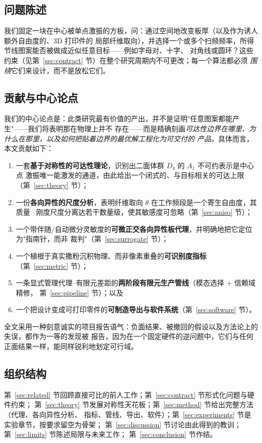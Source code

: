\documentclass[11pt,a4paper]{article}
\newcommand{\Aone}{A_1}
\newcommand{\Dfour}{D_4}
\begin{document}
\subsection{问题陈述}
我们固定一块在中心被单点激振的方板，问：通过空间地改变板厚（以及作为诱人额外自由度的、3D 打印件的
局部纤维取向），并选择一个或多个扫频频率，所得节线图案能否被做成近似任意目标------例如字母对、十字、
对角线或圆环？这些约束（见第~\ref{sec:contract} 节）在整个研究周期内不可更改；每一个算法都必须
\emph{围绕}它们来设计，而不是放松它们。

\subsection{贡献与中心论点}
我们的中心论点是：此类研究最有价值的产出，并不是证明"任意图案都能产生"------我们将表明那在物理上并不
存在------而是精确刻画\emph{可达性边界在哪里、为什么在那里，以及如何把贴着边界的最优解工程化为可交付的
产品。}具体而言，本文贡献如下：
\begin{enumerate}[label=（\arabic*）]
\item 一套\textbf{基于对称性的可达性理论}，识别出二面体群 $\Dfour$ 的 $\Aone$ 不可约表示是中心点
激振唯一能激发的通道，由此给出一个闭式的、与目标相关的可达上限（第~\ref{sec:theory} 节）；
\item 一份\textbf{各向异性的尺度分析}，表明纤维取向 $\theta$ 在工作频段是一个寄生自由度，其质量
--刚度尺度分离达若干数量级，使其敏感度可忽略（第~\ref{sec:aniso} 节）；
\item 一个带伴随/自动微分灵敏度的\textbf{可微正交各向异性板代理}，并明确地把它定位为"指南针，而非
裁判"（第~\ref{sec:surrogate} 节）；
\item 一个植根于真实撒粉沉积物理、而非像素重叠的\textbf{可识别度指标}（第~\ref{sec:metric} 节）；
\item 一条显式管理代理--有限元差距的\textbf{两阶段有限元生产管线}（模态选择 + 信赖域精修，
第~\ref{sec:pipeline} 节）；以及
\item 一个把设计变成可打印零件的\textbf{可制造导出与软件系统}（第~\ref{sec:software} 节）。
\end{enumerate}
全文采用一种刻意诚实的项目报告语气：负面结果、被撤回的假设以及方法论上的失误，都作为一等的发现被
报告，因为在一个固定硬件的逆问题中，它们与任何正面结果一样，能同样锐利地划定可行域。

\subsection{组织结构}
第~\ref{sec:related} 节回顾直接可比的前人工作；第~\ref{sec:contract} 节形式化问题与硬件约束；
第~\ref{sec:theory} 节发展对称性天花板；第~\ref{sec:method} 节给出完整方法（代理、各向异性分析、
指标、管线、导出、软件）；第~\ref{sec:experiments} 节是实验章节，按要求留空为骨架；
第~\ref{sec:discussion} 节讨论由此得到的教训；第~\ref{sec:limits} 节陈述局限与未来工作；
第~\ref{sec:conclusion} 节作结。
\end{document}
